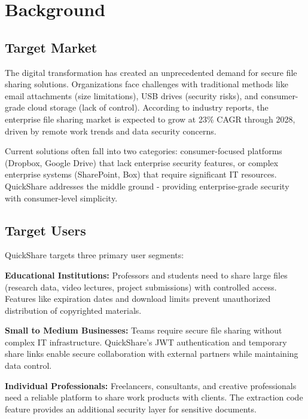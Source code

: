 \documentclass[final]{cvpr}
\begin{document}
\section{Background}

\subsection{Target Market}
The digital transformation has created an unprecedented demand for secure file sharing solutions. Organizations face challenges with traditional methods like email attachments (size limitations), USB drives (security risks), and consumer-grade cloud storage (lack of control). According to industry reports, the enterprise file sharing market is expected to grow at 23\% CAGR through 2028, driven by remote work trends and data security concerns.

Current solutions often fall into two categories: consumer-focused platforms (Dropbox, Google Drive) that lack enterprise security features, or complex enterprise systems (SharePoint, Box) that require significant IT resources. QuickShare addresses the middle ground - providing enterprise-grade security with consumer-level simplicity.

\subsection{Target Users}
QuickShare targets three primary user segments:

\textbf{Educational Institutions:} Professors and students need to share large files (research data, video lectures, project submissions) with controlled access. Features like expiration dates and download limits prevent unauthorized distribution of copyrighted materials.

\textbf{Small to Medium Businesses:} Teams require secure file sharing without complex IT infrastructure. QuickShare's JWT authentication and temporary share links enable secure collaboration with external partners while maintaining data control.

\textbf{Individual Professionals:} Freelancers, consultants, and creative professionals need a reliable platform to share work products with clients. The extraction code feature provides an additional security layer for sensitive documents.

\end{document}
